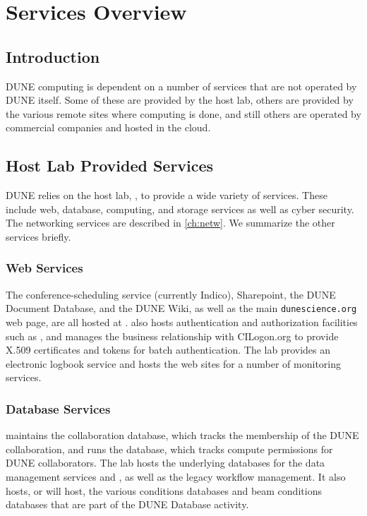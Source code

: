 \documentclass[../main-v1.tex]{subfiles}
\begin{document}
\chapter{Services Overview }
\label{ch:serv}

\section{Introduction}
DUNE computing is dependent on a number of services that are not operated by DUNE itself.
Some of these are provided by the host lab, others are provided by the various remote sites where
computing is done, and still others are operated by commercial companies and hosted in the cloud.

\section{Host Lab Provided Services}
DUNE relies on the host lab, , to provide a wide variety of services.  These include web, database, computing, and storage services as well as cyber security.  The networking services are described in \ref{ch:netw}.  We summarize the other services briefly.

\subsection{Web Services}
The conference-scheduling service (currently Indico), Sharepoint, the DUNE Document Database, and the DUNE Wiki, as well as the main {\tt dunescience.org} web page, are all hosted at .  %
 also hosts authentication and authorization facilities such as , and manages the business relationship with CILogon.org to provide X.509 certificates and   tokens for batch authentication. %
The lab provides an electronic logbook service and %
hosts the web sites for a number of monitoring services. 

\subsection{Database Services}
 maintains the collaboration database, which tracks the membership of the DUNE collaboration, and runs the  
database, which tracks compute permissions for DUNE collaborators.  The lab hosts the underlying databases for the data management
services  and , as well as the legacy  workflow management. It also hosts, or will host, the various conditions databases and beam conditions databases that are part of the DUNE Database activity.
\end{document}
